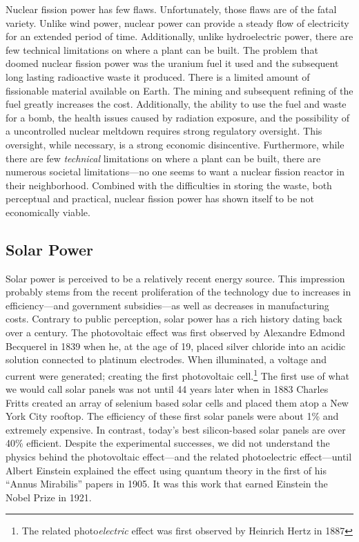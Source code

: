 Nuclear fission power has few flaws. Unfortunately, those flaws are of the fatal variety. Unlike wind power, nuclear power can provide a steady flow of electricity for an extended period of time. Additionally, unlike hydroelectric power, there are few technical limitations on where a plant can be built. The problem that doomed nuclear fission power was the uranium fuel it used and the subsequent long lasting radioactive waste it produced. There is a limited amount of fissionable material available on Earth. The mining and subsequent refining of the fuel greatly increases the cost. Additionally, the ability to use the fuel and waste for a bomb, the health issues caused by radiation exposure, and the possibility of a uncontrolled nuclear meltdown requires strong regulatory oversight. This oversight, while necessary, is a strong economic disincentive. Furthermore, while there are few \textit{technical} limitations on where a plant can be built, there are numerous societal limitations---no one seems to want a nuclear fission reactor in their neighborhood. Combined with the difficulties in storing the waste, both perceptual and practical, nuclear fission power has shown itself to be not economically viable.

\subsection{Solar Power}
Solar power is perceived to be a relatively recent energy source. This impression probably stems from the recent proliferation of the technology due to increases in efficiency---and government subsidies---as well as decreases in manufacturing costs. Contrary to public perception, solar power has a rich history dating back over a century. The photovoltaic effect was first observed by Alexandre Edmond Becquerel in 1839 when he, at the age of 19, placed silver chloride into an acidic solution connected to platinum electrodes. When illuminated, a voltage and current were generated; creating the first photovoltaic cell.\footnote{The related photo\textit{electric} effect was first observed by Heinrich Hertz in 1887} The first use of what we would call solar panels was not until 44 years later when in 1883 Charles Fritts created an array of selenium based solar cells and placed them atop a New York City rooftop\cite{historyofenergy}. The efficiency of these first solar panels were about 1\% and extremely expensive. In contrast, today's best silicon-based solar panels are over 40\% efficient. Despite the experimental successes, we did not understand the physics behind the photovoltaic effect---and the related photoelectric effect---until Albert Einstein explained the effect using quantum theory in the first of his ``Annus Mirabilis'' papers in 1905. It was this work that earned Einstein the Nobel Prize in 1921.

